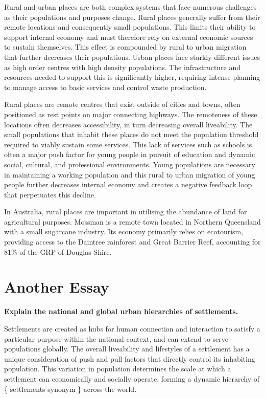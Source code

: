	Rural and urban places are both complex systems that face numerous challenges as their populations and purposes change. Rural places generally suffer from their remote locations and consequently small populations. This limits their ability to support internal economy and must therefore rely on external economic sources to sustain themselves. This effect is compounded by rural to urban migration that further decreases their populations. Urban places face starkly different issues as high order centres with high density populations. The infrastructure and resources needed to support this is significantly higher, requiring intense planning to manage access to basic services and control waste production.
	
	Rural places are remote centres that exist outside of cities and towns, often positioned as rest points on major connecting highways. The remoteness of these locations often decreases accessibility, in turn decreasing overall liveability. The small populations that inhabit these places do not meet the population threshold required to viably sustain some services. This lack of services such as schools is often a major push factor for young people in pursuit of education and dynamic social, cultural, and professional environments. Young populations are necessary in maintaining a working population and this rural to urban migration of young people further decreases internal economy and creates a negative feedback loop that perpetuates this decline.

	In Australia, rural places are important in utilising the abundance of land for agricultural purposes. Mossman is a remote town located in Northern Queensland with a small sugarcane industry. Its economy primarily relies on ecotourism, providing access to the Daintree rainforest and Great Barrier Reef, accounting for 81\% of the GRP of Douglas Shire.

\section{Another Essay}

	\textbf{Explain the national and global urban hierarchies of settlements.}

	Settlements are created as hubs for human connection and interaction to satisfy a particular purpose within the national context, and can extend to serve populations globally. The overall liveability and lifestyles of a settlement has a unique consideration of push and pull factors that directly control its inhabiting population. This variation in population determines the scale at which a settlement can economically and socially operate, forming a dynamic hierarchy of \{ settlements synonym \} across the world.

